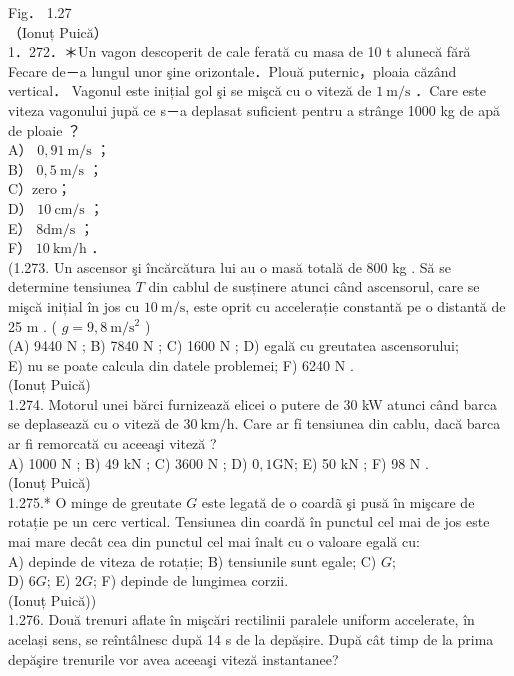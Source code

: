 \documentclass[10pt]{article}
\begin{document}
Fig． 1.27\\
（Ionuț Puică）\\
1．272．＊Un vagon descoperit de cale ferată cu masa de 10 t alunecă fără Fecare de－a lungul unor şine orizontale．Plouă puternic，ploaia căzând vertical． Vagonul este inițial gol şi se mişcă cu o viteză de $1 \mathrm{~m} / \mathrm{s}$ ．Care este viteza vagonului jupă ce s－a deplasat suficient pentru a strânge 1000 kg de apă de ploaie ？\\
A） $0,91 \mathrm{~m} / \mathrm{s}$ ；\\
B） $0,5 \mathrm{~m} / \mathrm{s}$ ；\\
C）zero；\\
D） $10 \mathrm{~cm} / \mathrm{s}$ ；\\
E） $8 \mathrm{dm} / \mathrm{s}$ ；\\
F） $10 \mathrm{~km} / \mathrm{h}$ ．\\
(1.273. Un ascensor şi încărcătura lui au o masă totală de 800 kg . Să se determine tensiunea $T$ din cablul de susținere atunci când ascensorul, care se mişcă inițial în jos cu $10 \mathrm{~m} / \mathrm{s}$, este oprit cu accelerație constantă pe o distantă de 25 m . ( $g=9,8 \mathrm{~m} / \mathrm{s}^{2}$ )\\
(A) 9440 N ; B) 7840 N ; C) 1600 N ; D) egală cu greutatea ascensorului;\\
E) nu se poate calcula din datele problemei; F) 6240 N .\\
(Ionuț Puică)\\
1.274. Motorul unei bărci furnizează elicei o putere de 30 kW atunci când barca se deplasează cu o viteză de $30 \mathrm{~km} / \mathrm{h}$. Care ar fỉ tensiunea din cablu, dacă barca ar fi remorcată cu aceeaşi viteză ?\\
A) 1000 N ; B) 49 kN ; C) 3600 N ; D) $0,1 \mathrm{GN}$; E) 50 kN ; F) 98 N .\\
(Ionuț Puică)\\
1.275.* O minge de greutate $G$ este legată de o coardã şi pusă în mişcare de rotație pe un cerc vertical. Tensiunea din coardă în punctul cel mai de jos este mai mare decât cea din punctul cel mai înalt cu o valoare egală cu:\\
A) depinde de viteza de rotație; B) tensiunile sunt egale; C) $G$;\\
D) $6 G$; E) $2 G$; F) depinde de lungimea corzii.\\
(Ionuț Puică))\\
1.276. Două trenuri aflate în mişcări rectilinii paralele uniform accelerate, în același sens, se reîntâlnesc după 14 s de la depășire. După cât timp de la prima depăşire trenurile vor avea aceeaşi viteză instantanee?\\
\end{document}

